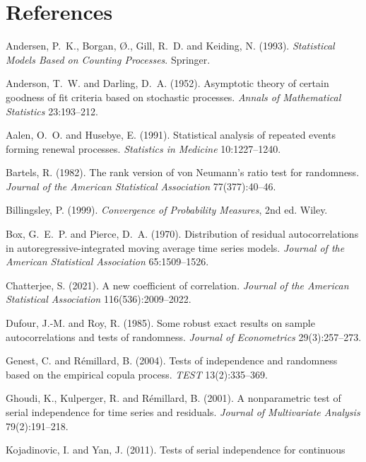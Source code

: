 \documentclass[11pt,a4paper]{article}
\begin{document}
\section*{References}

\begin{description}[leftmargin=1.2em,labelindent=0em,itemsep=1pt,font=\normalfont]
\item Andersen, P.~K., Borgan, Ø., Gill, R.~D. and Keiding, N. (1993).
\emph{Statistical Models Based on Counting Processes}. Springer.
\item Anderson, T.~W. and Darling, D.~A. (1952). Asymptotic theory of certain goodness of
fit criteria based on stochastic processes. \emph{Annals of Mathematical Statistics}
23:193--212.
\item Aalen, O.~O. and Husebye, E. (1991). Statistical analysis of repeated events
forming renewal processes. \emph{Statistics in Medicine} 10:1227--1240.
\item Bartels, R. (1982). The rank version of von Neumann's ratio test for randomness.
\emph{Journal of the American Statistical Association} 77(377):40--46.
\item Billingsley, P. (1999). \emph{Convergence of Probability Measures}, 2nd ed. Wiley.
\item Box, G.~E.~P. and Pierce, D.~A. (1970). Distribution of residual autocorrelations
in autoregressive-integrated moving average time series models. \emph{Journal of the
American Statistical Association} 65:1509--1526.
\item Chatterjee, S. (2021). A new coefficient of correlation. \emph{Journal of the
American Statistical Association} 116(536):2009--2022.
\item Dufour, J.-M. and Roy, R. (1985). Some robust exact results on sample
autocorrelations and tests of randomness. \emph{Journal of Econometrics} 29(3):257--273.
\item Genest, C. and Rémillard, B. (2004). Tests of independence and randomness based on
the empirical copula process. \emph{TEST} 13(2):335--369.
\item Ghoudi, K., Kulperger, R. and Rémillard, B. (2001). A nonparametric test of serial
independence for time series and residuals. \emph{Journal of Multivariate Analysis}
79(2):191--218.
\item Kojadinovic, I. and Yan, J. (2011). Tests of serial independence for continuous

\end{description}
\end{document}
